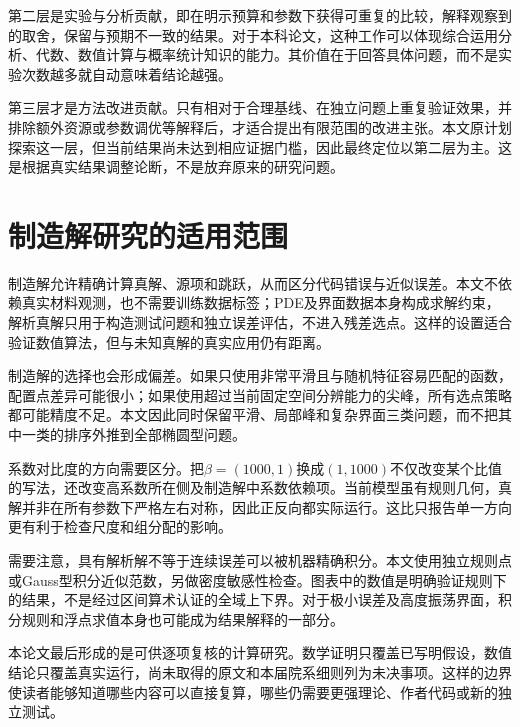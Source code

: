 第二层是实验与分析贡献，即在明示预算和参数下获得可重复的比较，解释观察到的取舍，保留与预期不一致的结果。对于本科论文，这种工作可以体现综合运用分析、代数、数值计算与概率统计知识的能力。其价值在于回答具体问题，而不是实验次数越多就自动意味着结论越强。

第三层才是方法改进贡献。只有相对于合理基线、在独立问题上重复验证效果，并排除额外资源或参数调优等解释后，才适合提出有限范围的改进主张。本文原计划探索这一层，但当前结果尚未达到相应证据门槛，因此最终定位以第二层为主。这是根据真实结果调整论断，不是放弃原来的研究问题。

\section{制造解研究的适用范围}
制造解允许精确计算真解、源项和跳跃，从而区分代码错误与近似误差。本文不依赖真实材料观测，也不需要训练数据标签；PDE及界面数据本身构成求解约束，解析真解只用于构造测试问题和独立误差评估，不进入残差选点。这样的设置适合验证数值算法，但与未知真解的真实应用仍有距离。

制造解的选择也会形成偏差。如果只使用非常平滑且与随机特征容易匹配的函数，配置点差异可能很小；如果使用超过当前固定空间分辨能力的尖峰，所有选点策略都可能精度不足。本文因此同时保留平滑、局部峰和复杂界面三类问题，而不把其中一类的排序外推到全部椭圆型问题。

系数对比度的方向需要区分。把$\beta=(1000,1)$换成$(1,1000)$不仅改变某个比值的写法，还改变高系数所在侧及制造解中系数依赖项。当前模型虽有规则几何，真解并非在所有参数下严格左右对称，因此正反向都实际运行。这比只报告单一方向更有利于检查尺度和组分配的影响。

需要注意，具有解析解不等于连续误差可以被机器精确积分。本文使用独立规则点或Gauss型积分近似范数，另做密度敏感性检查。图表中的数值是明确验证规则下的结果，不是经过区间算术认证的全域上下界。对于极小误差及高度振荡界面，积分规则和浮点求值本身也可能成为结果解释的一部分。

本论文最后形成的是可供逐项复核的计算研究。数学证明只覆盖已写明假设，数值结论只覆盖真实运行，尚未取得的原文和本届院系细则列为未决事项。这样的边界使读者能够知道哪些内容可以直接复算，哪些仍需要更强理论、作者代码或新的独立测试。
